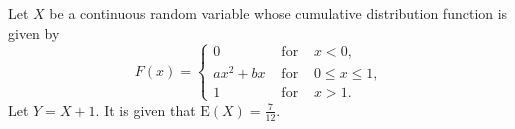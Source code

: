 \documentclass[letterpaper,10pt,addpoints]{exam}
\begin{document}


\newpage
\begin{questions}
\question[35]
Let $X$ be a continuous random variable whose cumulative distribution function is given by
$$
F(x)=\left\{\begin{array}{lll}
0 & \text { for } & x<0, \\
a x^2+b x & \text { for } & 0 \leq x \leq 1, \\
1 & \text { for } & x>1 .
\end{array}\right.
$$
Let $Y = X+1$. It is given that $\mathrm{E}(X)=\frac{7}{12}$.
\end{questions}
\end{document}
